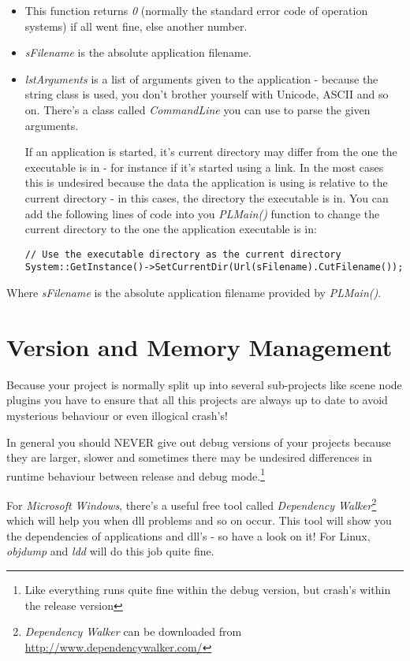 \begin{itemize}
\item{This function returns \emph{0} (normally the standard error code of operation systems) if all went fine, else another number.}
\item{\emph{sFilename} is the absolute application filename.}
\item{\emph{lstArguments} is a list of arguments given to the application - because the string class is used, you don't brother yourself with Unicode, ASCII and so on. There's a class called \emph{CommandLine} you can use to parse the given arguments.}

If an application is started, it's current directory may differ from the one the executable is in - for instance if it's started using a link. In the most cases this is undesired because the data the application is using is relative to the current directory - in this cases, the directory the executable is in. You can add the following lines of code into you \emph{PLMain()} function to change the current directory to the one the application executable is in:

\begin{lstlisting}[caption=Set current directory example]
// Use the executable directory as the current directory
System::GetInstance()->SetCurrentDir(Url(sFilename).CutFilename());
\end{lstlisting}
\end{itemize}

Where \emph{sFilename} is the absolute application filename provided by \emph{PLMain()}.




\section{Version and Memory Management}
Because your project is normally split up into several sub-projects like scene node plugins you have to ensure that all this projects are always up to date to avoid mysterious behaviour or even illogical crash's!

In general you should NEVER give out debug versions of your projects because they are larger, slower and sometimes there may be undesired differences in runtime behaviour between release and debug mode.\footnote{Like everything runs quite fine within the debug version, but crash's within the release version}

For \emph{Microsoft Windows}, there's a useful free tool called \emph{Dependency Walker}\footnote{\emph{Dependency Walker} can be downloaded from \url{http://www.dependencywalker.com/}} which will help you when dll problems and so on occur. This tool will show you the dependencies of applications and dll's - so have a look on it! For Linux, \emph{objdump} and \emph{ldd} will do this job quite fine.

